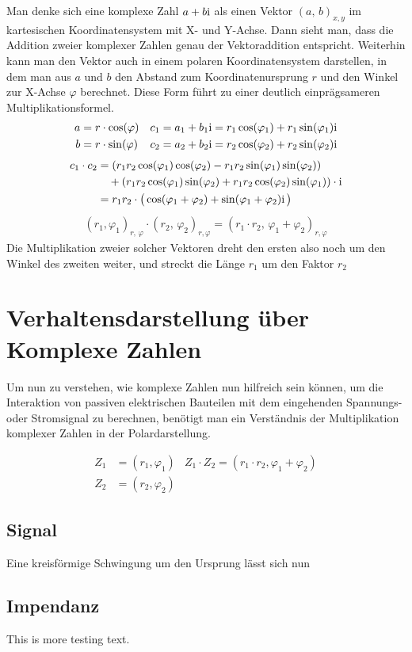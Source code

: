 Man denke sich eine komplexe Zahl $a +b\mathrm{i}$ als einen Vektor $(a,\,b)_{x,y}$ im kartesischen Koordinatensystem mit X- und Y-Achse.
Dann sieht man, dass die Addition zweier komplexer Zahlen genau der Vektoraddition entspricht.
Weiterhin kann man den Vektor auch in einem polaren Koordinatensystem darstellen, in dem man aus $a$ und $b$ den 
Abstand zum Koordinatenursprung $r$ und den Winkel zur X-Achse $\varphi$ berechnet. Diese Form führt zu einer deutlich einprägsameren Multiplikationsformel.  
\begin{align*}
    a&=r \cdot \cos(\varphi) & c_1 &= a_1+b_1\mathrm{i} = r_1\cos(\varphi_1) + r_1\sin(\varphi_1)\mathrm{i}  \\
    b&=r \cdot \sin(\varphi) & c_2 &= a_2+b_2\mathrm{i} = r_2\cos(\varphi_2) + r_2\sin(\varphi_2)\mathrm{i}
\end{align*} \vspace*{-5mm}
\begin{align*}
    c_1 \cdot c_2 &= (r_1r_2\cos(\varphi_1)\cos(\varphi_2) - r_1r_2\sin(\varphi_1)\sin(\varphi_2)) \\
    &\quad + (r_1r_2\cos(\varphi_1)\sin(\varphi_2) + r_1r_2\cos(\varphi_2)\sin(\varphi_1)) \cdot \mathrm{i}\\
    &= r_1r_2 \cdot \big(\cos(\varphi_1 + \varphi_2) + \sin(\varphi_1 + \varphi_2)\mathrm{i}\, \big)
\end{align*} \vspace*{-5mm}
\begin{align*}
    (r_1,\varphi_1)_{r,\,\varphi} \cdot (r_2,\,\varphi_2)_{r,\varphi} = (r_1 \cdot r_2,\, \varphi_1 + \varphi_2)_{r,\varphi}
\end{align*}
Die Multiplikation zweier solcher Vektoren dreht den ersten also noch um den Winkel des zweiten weiter, und streckt die Länge $r_1$ um den Faktor $r_2$

\section{Verhaltensdarstellung über Komplexe Zahlen}

Um nun zu verstehen, wie komplexe Zahlen nun hilfreich sein können,
um die Interaktion von passiven elektrischen Bauteilen mit dem eingehenden Spannungs- oder Stromsignal 
zu berechnen, benötigt man ein Verständnis der Multiplikation komplexer Zahlen in der Polardarstellung.


\begin{align*}
    Z_1&= (r_1, \varphi_1) & Z_1 \cdot Z_2 = (r_1 \cdot r_2, \varphi_1 + \varphi_2) \\
    Z_2&= (r_2, \varphi_2)
\end{align*}

\subsection{Signal}
Eine kreisförmige Schwingung um den Ursprung lässt sich nun

\subsection{Impendanz}
This is more testing text.
